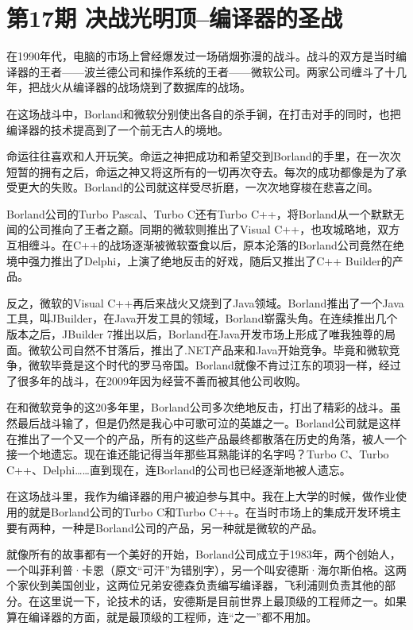 \documentclass[
  letterpaper,
  DIV=11,
  numbers=noendperiod]{scrreprt}
\begin{document}

\chapter{第17期
决战光明顶--编译器的圣战}\label{ux7b2c17ux671f-ux51b3ux6218ux5149ux660eux9876ux7f16ux8bd1ux5668ux7684ux5723ux6218}

在1990年代，电脑的市场上曾经爆发过一场硝烟弥漫的战斗。战斗的双方是当时编译器的王者------波兰德公司和操作系统的王者------微软公司。两家公司缠斗了十几年，把战火从编译器的战场烧到了数据库的战场。

在这场战斗中，Borland和微软分别使出各自的杀手锏，在打击对手的同时，也把编译器的技术提高到了一个前无古人的境地。

命运往往喜欢和人开玩笑。命运之神把成功和希望交到Borland的手里，在一次次短暂的拥有之后，命运之神又将这所有的一切再次夺去。每次的成功都像是为了承受更大的失败。Borland的公司就这样受尽折磨，一次次地穿梭在悲喜之间。

Borland公司的Turbo Pascal、Turbo C还有Turbo
C++，将Borland从一个默默无闻的公司推向了王者之巅。同期的微软则推出了Visual
C++，也攻城略地，双方互相缠斗。在C++的战场逐渐被微软蚕食以后，原本沦落的Borland公司竟然在绝境中强力推出了Delphi，上演了绝地反击的好戏，随后又推出了C++
Builder的产品。

反之，微软的Visual
C++再后来战火又烧到了Java领域。Borland推出了一个Java工具，叫JBuilder，在Java开发工具的领域，Borland崭露头角。在连续推出几个版本之后，JBuilder
7推出以后，Borland在Java开发市场上形成了唯我独尊的局面。微软公司自然不甘落后，推出了.NET产品来和Java开始竞争。毕竟和微软竞争，微软毕竟是这个时代的罗马帝国。Borland就像不肯过江东的项羽一样，经过了很多年的战斗，在2009年因为经营不善而被其他公司收购。

在和微软竞争的这20多年里，Borland公司多次绝地反击，打出了精彩的战斗。虽然最后战斗输了，但是仍然是我心中可歌可泣的英雄之一。Borland公司就是这样在推出了一个又一个的产品，所有的这些产品最终都散落在历史的角落，被人一个接一个地遗忘。现在谁还能记得当年那些耳熟能详的名字吗？Turbo
C、Turbo
C++、Delphi\ldots\ldots 直到现在，连Borland的公司也已经逐渐地被人遗忘。

在这场战斗里，我作为编译器的用户被迫参与其中。我在上大学的时候，做作业使用的就是Borland公司的Turbo
C和Turbo
C++。在当时市场上的集成开发环境主要有两种，一种是Borland公司的产品，另一种就是微软的产品。

就像所有的故事都有一个美好的开始，Borland公司成立于1983年，两个创始人，一个叫菲利普·卡恩（原文``可汗''为错别字），另一个叫安德斯·海尔斯伯格。这两个家伙到美国创业，这两位兄弟安德森负责编写编译器，飞利浦则负责其他的部分。在这里说一下，论技术的话，安德斯是目前世界上最顶级的工程师之一。如果算在编译器的方面，就是最顶级的工程师，连``之一''都不用加。
\end{document}
